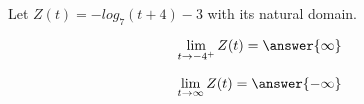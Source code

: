 \documentclass{ximera}
\author{Lee Wayand}
\begin{document}
\begin{exercise}






Let $Z(t) = -log_7(t+4) - 3$ with its natural domain. \\







\begin{question}


\[
\lim\limits_{t \to -4^+} Z(t) = \answer{\infty}
\]


\end{question}








\begin{question}


\[
\lim\limits_{t \to \infty} Z(t) = \answer{-\infty}
\]


\end{question}










\end{exercise}
\end{document}
